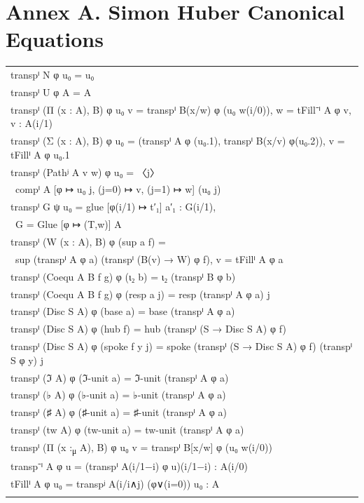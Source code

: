 \documentclass[a4paper,UKenglish,cleveref, autoref, thm-restate]{lipics-v2021}
\newcommand{\tabstyle}[0]{\scriptsize\ttfamily\fontseries{l}\selectfont}
\begin{document}
\appendix
\newpage
\section{Annex A. Simon Huber Canonical Equations}
\label{sec:appendix-b}

\begin{table}[ht!]
\tabstyle
\begin{tabular}{l}
transpⁱ N φ u₀ = u₀ \\
transpⁱ U φ A = A \\
transpⁱ (Π (x : A), B) φ u₀ v = transpⁱ B(x/w) φ (u₀ w(i/0)), w = tFill⁻ⁱ A φ v, v : A(i/1) \\
transpⁱ (Σ (x : A), B) φ u₀ = (transpⁱ A φ (u₀.1), transpⁱ B(x/v) φ(u₀.2)), v = tFillⁱ A φ u₀.1 \\
transpⁱ (Pathʲ A v w) φ u₀ = 〈j〉\\
\ compⁱ A [φ ↦ u₀ j, (j=0) ↦ v, (j=1) ↦ w] (u₀ j) \\
transpⁱ G ψ u₀ = glue [φ(i/1) ↦ t′₁] a′₁ : G(i/1), \\
\ G = Glue [φ ↦ (T,w)] A \\
transpⁱ (W (x : A), B) φ (sup a f) = \\
\ sup (transpⁱ A φ a) (transpⁱ (B(v) → W) φ f), v = tFillⁱ A φ a \\
transpⁱ (Coequ A B f g) φ (ι₂ b) = ι₂ (transpⁱ B φ b) \\
transpⁱ (Coequ A B f g) φ (resp a j) = resp (transpⁱ A φ a) j \\
transpⁱ (Disc S A) φ (base a) = base (transpⁱ A φ a) \\
transpⁱ (Disc S A) φ (hub f) = hub (transpⁱ (S → Disc S A) φ f) \\
transpⁱ (Disc S A) φ (spoke f y j) = spoke (transpⁱ (S → Disc S A) φ f) (transpⁱ S φ y) j \\
transpⁱ (ℑ A) φ (ℑ-unit a) = ℑ-unit (transpⁱ A φ a) \\
transpⁱ (♭ A) φ (♭-unit a) = ♭-unit (transpⁱ A φ a) \\
transpⁱ (♯ A) φ (♯-unit a) = ♯-unit (transpⁱ A φ a) \\
transpⁱ (tw A) φ (tw-unit a) = tw-unit (transpⁱ A φ a) \\
transpⁱ (Π (x :\textsubscript{μ} A), B) φ u₀ v = transpⁱ B[x/w] φ (u₀ w(i/0)) \\
transp⁻ⁱ A φ u = (transpⁱ A(i/1−i) φ u)(i/1−i) : A(i/0) \\
tFillⁱ A φ u₀ = transpʲ A(i/i∧j) (φ∨(i=0)) u₀ : A \\
\\

\end{tabular}
\end{table}
\end{document}

